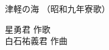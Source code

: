 \documentclass[10pt,b5j]{tarticle} %
\begin{document}
\begin{minipage}[c]{0.7\hsize} %
    \begin{center}
        {\LARGE
            津軽の海 %
        }
        {\small 
            （昭和九年寮歌） %
        }
    \end{center}
\end{minipage}
\begin{minipage}[c]{0.3\hsize} %
    \begin{flushright} %
        星勇君 作歌\\白石祐義君 作曲 %
    \end{flushright}
\end{minipage}
\end{document}
